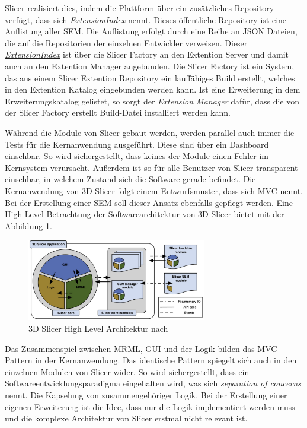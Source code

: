 Slicer realisiert dies, indem die Plattform über ein zusätzliches Repository
verfügt, dass sich \href{https://github.com/Slicer/ExtensionsIndex?tab=readme-ov-file}{\textit{ExtensionIndex}}
nennt. Dieses öffentliche Repository ist eine Auflistung aller \ac{SEM}. Die
Auflistung erfolgt durch eine Reihe an \ac{JSON} Dateien, die auf die
Repositorien der einzelnen Entwickler verweisen. Dieser \href{https://github.com/Slicer/ExtensionsIndex?tab=readme-ov-file}{\textit{ExtensionIndex}}
ist über die Slicer Factory an den Extention Server und damit auch an den Extention
Manager angebunden. Die Slicer Factory ist ein System, das aus einem Slicer Extention
Repository ein lauffähiges Build erstellt, welches in den Extention Katalog
eingebunden werden kann. Ist eine Erweiterung in dem Erweiterungskatalog gelistet,
so sorgt der \textit{Extension Manager} dafür, dass die von der Slicer Factory
erstellt Build-Datei installiert werden kann.

Während die Module von Slicer gebaut werden, werden parallel auch immer die Tests
für die Kernanwendung ausgeführt. Diese sind über ein Dashboard einsehbar. So wird
sichergestellt, dass keines der Module einen Fehler im Kernsystem verursacht. Außerdem
ist so für alle Benutzer von Slicer transparent einsehbar, in welchem Zustand
sich die Software gerade befindet. Die Kernanwendung von 3D Slicer folgt einem Entwurfsmuster,
dass sich \ac{MVC} nennt. Bei der Erstellung einer \ac{SEM} soll dieser Ansatz ebenfalls
gepflegt werden. Eine High Level Betrachtung der Softwarearchitektur von 3D
Slicer bietet \cite[S.~1332]{fedorov2012slicer} mit der Abbildung
\ref{fig:3d_slicer_architektur}.

\begin{figure}[h]
	\centering
	\includegraphics[width=0.7\textwidth]{img/3d_slicer_architektur.jpg}
	\caption{3D Slicer High Level Architektur nach \citet[S.~1332]{fedorov2012slicer}}
	\label{fig:3d_slicer_architektur}
\end{figure}

Das Zusammenspiel zwischen \ac{MRML}, \ac{GUI} und der Logik bilden das MVC-Pattern
in der Kernanwendung. Das identische Pattern spiegelt sich auch in den einzelnen
Modulen von Slicer wider. So wird sichergestellt, dass ein Softwareentwicklungsparadigma
eingehalten wird, was sich \textit{separation of concerns} nennt. Die Kapselung
von zusammengehöriger Logik. Bei der Erstellung einer eigenen Erweiterung ist die
Idee, dass nur die Logik implementiert werden muss und die komplexe Architektur
von Slicer erstmal nicht relevant ist.

